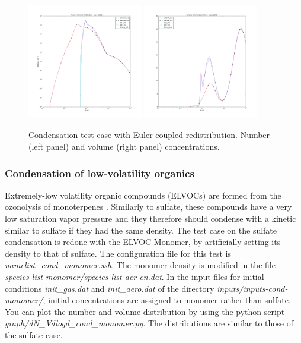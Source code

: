 \documentclass[a4paper,11pt]{article}
\begin{document}
\begin{figure}[H]
        \begin{center}
                \includegraphics[angle=0,width=0.45\textwidth]{../graph/figure_ref/dNdlogd_COND_r12.png}
                \includegraphics[angle=0,width=0.45\textwidth]{../graph/figure_ref/dVdlogd_COND_r12.png}
        \end{center}
\caption{Condensation test case with Euler-coupled redistribution. Number (left panel) and volume (right panel) concentrations.}
\label{fig-cond-redist}
\end{figure}
       
\subsubsection{Condensation of low-volatility organics}

Extremely-low volatility organic compounds (ELVOCs) are formed from the ozonolysis of monoterpenes \cite{chrit2017modelling} .
Similarly to sulfate, these compounds have a very low saturation vapor pressure and they therefore should condense with a kinetic similar to sulfate if they had the same density.
The test case on the sulfate condensation is redone with the ELVOC Monomer, by artificially setting its density to that of sulfate.
The configuration file for this test is {\it{namelist\_cond\_monomer.ssh}}.
The monomer density is modified in the file {\it{species-list-monomer/species-list-aer-en.dat}}.
In the input files for initial conditions {\it{init\_gas.dat}} and {\it{init\_aero.dat}} of the directory {\it{inputs/inputs-cond-monomer/}}, initial concentrations are assigned to monomer rather than sulfate. You can plot the number and volume distribution by using the python script {\it{graph/dN\_Vdlogd\_cond\_monomer.py}}. 
The distributions are similar to those of the sulfate case.
\end{document}
